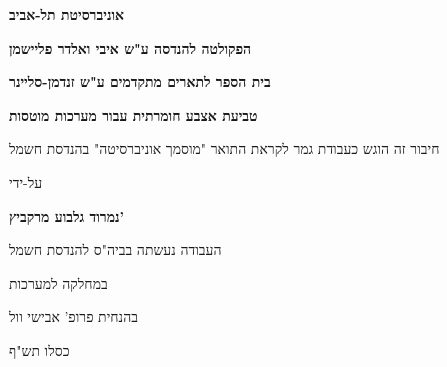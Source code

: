 \begin{otherlanguage}{hebrew}
\begin{center}
\begin{davidfont}
  \vspace*{1cm}
  
  \large
  \textbf{אוניברסיטת תל-אביב}
  
  \footnotesize
  \textbf{הפקולטה להנדסה ע"ש איבי ואלדר פליישמן}
   
  \textbf{בית הספר לתארים מתקדמים ע"ש זנדמן-סליינר}
   
  \vspace{1.2cm}
  \LARGE
  \textbf{טביעת אצבע חומרתית עבור מערכות מוטסות}
  
  \vspace{0.5cm}
   
  \vspace{1cm}
  \normalsize
  חיבור זה הוגש כעבודת גמר לקראת התואר "מוסמך אוניברסיטה" בהנדסת חשמל
   
  \vspace{0.5cm}
  על-ידי
   
  \Large
  \textbf{נמרוד גלבוע מרקביץ'}
   
  \vspace{1 cm}
  \normalsize
  העבודה נעשתה בביה"ס להנדסת חשמל
  
  במחלקה למערכות
   
  \vspace{0.5cm}
  
  בהנחית פרופ' אבישי וול
   
  \vspace{0.5cm}
  \large
  כסלו תש"ף
\end{davidfont}
\end{center}
\end{otherlanguage}
